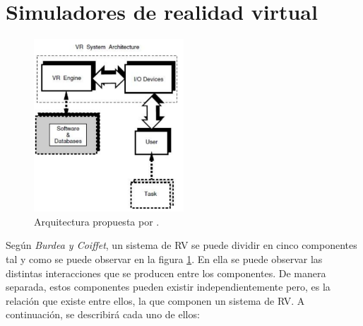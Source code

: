 \section{Simuladores de realidad virtual}
\label{art:simulador}

\begin{figure}[h]
   \centering
    \includegraphics[width=0.5\textwidth]{IMG/VRarq.PNG}
    \caption{Arquitectura propuesta por \cite{burdea2003virtual}. }
   \label{fig:RVarq}
\end{figure}
Según \emph{Burdea y Coiffet}\cite{burdea2003virtual}, un sistema de \ac{RV} se puede dividir en cinco componentes tal y como se puede observar en la figura \ref{fig:RVarq}. En ella se puede observar las distintas interacciones que se producen entre los componentes. De manera separada, estos componentes pueden existir independientemente pero, es la relación que existe entre ellos, la que componen un sistema de \ac{RV}. A continuación, se describirá cada uno de ellos:
